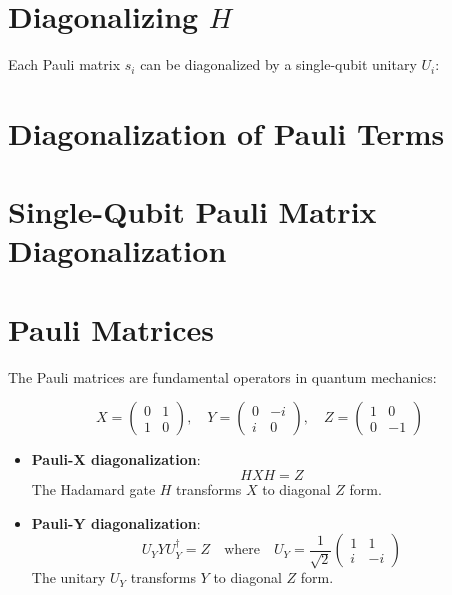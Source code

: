 \documentclass{article}
\begin{document}
\section{Diagonalizing $H$}
Each Pauli matrix $s_i$ can be diagonalized by a single-qubit unitary $U_i$:
\section{Diagonalization of Pauli Terms}


\section{Single-Qubit Pauli Matrix Diagonalization}

\section{Pauli Matrices}

The Pauli matrices are fundamental operators in quantum mechanics:

\begin{equation}
X = \begin{pmatrix} 0 & 1 \\ 1 & 0 \end{pmatrix}, \quad
Y = \begin{pmatrix} 0 & -i \\ i & 0 \end{pmatrix}, \quad
Z = \begin{pmatrix} 1 & 0 \\ 0 & -1 \end{pmatrix}
\end{equation}

\begin{itemize}

    \item \textbf{Pauli-X diagonalization}:
    \begin{equation}
    HXH = Z
    \end{equation}
    The Hadamard gate $H$ transforms $X$ to diagonal $Z$ form.

    \item \textbf{Pauli-Y diagonalization}:
    \begin{equation}
    U_Y Y U_Y^\dagger = Z \quad \text{where} \quad U_Y = \frac{1}{\sqrt{2}}\begin{pmatrix} 1 & 1 \\ i & -i \end{pmatrix}
    \end{equation}
    The unitary $U_Y$ transforms $Y$ to diagonal $Z$ form.
  \end{itemize}
 
\end{document}
